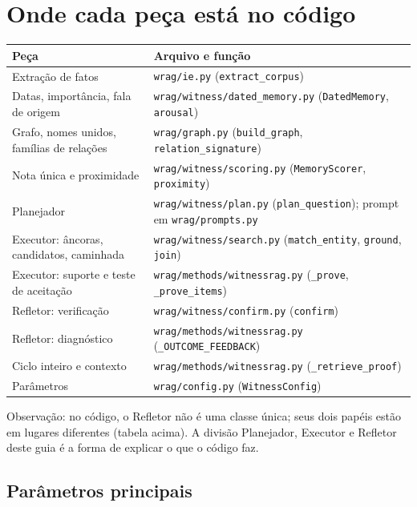 \documentclass[11pt]{article}
\begin{document}
\section{Onde cada peça está no código}
\label{sec:codigo}

\begin{center}\small
\begin{tabularx}{\textwidth}{@{}l Y@{}}
\toprule
Peça & Arquivo e função \\
\midrule
Extração de fatos & \texttt{wrag/ie.py} (\texttt{extract\_corpus}) \\
Datas, importância, fala de origem & \texttt{wrag/witness/dated\_memory.py} (\texttt{DatedMemory}, \texttt{arousal}) \\
Grafo, nomes unidos, famílias de relações & \texttt{wrag/graph.py} (\texttt{build\_graph}, \texttt{relation\_signature}) \\
Nota única e proximidade & \texttt{wrag/witness/scoring.py} (\texttt{MemoryScorer}, \texttt{proximity}) \\
Planejador & \texttt{wrag/witness/plan.py} (\texttt{plan\_question}); prompt em \texttt{wrag/prompts.py} \\
Executor: âncoras, candidatos, caminhada & \texttt{wrag/witness/search.py} (\texttt{match\_entity}, \texttt{ground}, \texttt{join}) \\
Executor: suporte e teste de aceitação & \texttt{wrag/methods/witnessrag.py} (\texttt{\_prove}, \texttt{\_prove\_items}) \\
Refletor: verificação & \texttt{wrag/witness/confirm.py} (\texttt{confirm}) \\
Refletor: diagnóstico & \texttt{wrag/methods/witnessrag.py} (\texttt{\_OUTCOME\_FEEDBACK}) \\
Ciclo inteiro e contexto & \texttt{wrag/methods/witnessrag.py} (\texttt{\_retrieve\_proof}) \\
Parâmetros & \texttt{wrag/config.py} (\texttt{WitnessConfig}) \\
\bottomrule
\end{tabularx}
\end{center}

Observação: no código, o Refletor não é uma classe única; seus dois papéis
estão em lugares diferentes (tabela acima). A divisão Planejador, Executor e
Refletor deste guia é a forma de explicar o que o código faz.

\subsection*{Parâmetros principais}
\end{document}

